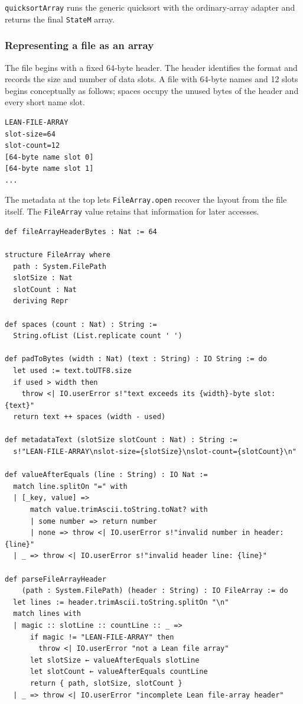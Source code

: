 \documentclass[11pt]{article}
\begin{document}
\texttt{quicksortArray} runs the generic quicksort with the ordinary-array adapter and
returns the final \texttt{StateM} array.
\subsubsection{Representing a file as an array}
\label{sec:orgfd84e72}

The file begins with a fixed 64-byte header.  The header identifies the format
and records the size and number of data slots.  A file with 64-byte names and
12 slots begins conceptually as follows; spaces occupy the unused bytes of the
header and every short name slot.

\begin{verbatim}
LEAN-FILE-ARRAY
slot-size=64
slot-count=12
[64-byte name slot 0]
[64-byte name slot 1]
...
\end{verbatim}

The metadata at the top lets \texttt{FileArray.open} recover the layout from the file
itself.  The \texttt{FileArray} value retains that information for later accesses.

\begin{verbatim}
def fileArrayHeaderBytes : Nat := 64

structure FileArray where
  path : System.FilePath
  slotSize : Nat
  slotCount : Nat
  deriving Repr

def spaces (count : Nat) : String :=
  String.ofList (List.replicate count ' ')

def padToBytes (width : Nat) (text : String) : IO String := do
  let used := text.toUTF8.size
  if used > width then
    throw <| IO.userError s!"text exceeds its {width}-byte slot: {text}"
  return text ++ spaces (width - used)

def metadataText (slotSize slotCount : Nat) : String :=
  s!"LEAN-FILE-ARRAY\nslot-size={slotSize}\nslot-count={slotCount}\n"

def valueAfterEquals (line : String) : IO Nat :=
  match line.splitOn "=" with
  | [_key, value] =>
      match value.trimAscii.toString.toNat? with
      | some number => return number
      | none => throw <| IO.userError s!"invalid number in header: {line}"
  | _ => throw <| IO.userError s!"invalid header line: {line}"

def parseFileArrayHeader
    (path : System.FilePath) (header : String) : IO FileArray := do
  let lines := header.trimAscii.toString.splitOn "\n"
  match lines with
  | magic :: slotLine :: countLine :: _ =>
      if magic != "LEAN-FILE-ARRAY" then
        throw <| IO.userError "not a Lean file array"
      let slotSize ← valueAfterEquals slotLine
      let slotCount ← valueAfterEquals countLine
      return { path, slotSize, slotCount }
  | _ => throw <| IO.userError "incomplete Lean file-array header"
\end{verbatim}
\end{document}

